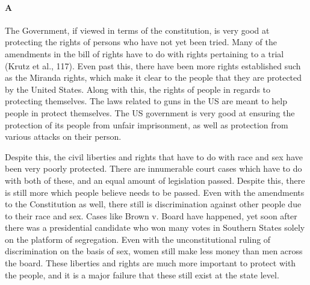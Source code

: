\documentclass[12pt]{article}
\begin{document}
\paragraph{A}
The Government, if viewed in terms of the constitution, is very good
at protecting the rights of persons who have not yet been tried. Many
of the amendments in the bill of rights have to do with rights
pertaining to a trial (Krutz et al., 117). Even past this, there have
been more rights established such as the Miranda rights, which make it
clear to the people that they are protected by the United
States. Along with this, the rights of people in regards to protecting
themselves. The laws related to guns in the US are meant to help
people in protect themselves. The US government is very good at
ensuring the protection of its people from unfair imprisonment, as
well as protection from various attacks on their person.
\par
Despite this, the civil liberties and rights that have to do with race
and sex have been very poorly protected. There are innumerable court
cases which have to do with both of these, and an equal amount of
legislation passed. Despite this, there is still more which people
believe needs to be passed. Even with the amendments to the
Constitution as well, there still is discrimination against other
people due to their race and sex. Cases like Brown v. Board have
happened, yet soon after there was a presidential candidate who won
many votes in Southern States solely on the platform of
segregation. Even with the unconstitutional ruling of discrimination
on the basis of sex, women still make less money than men across the
board. These liberties and rights are much more important to protect
with the people, and it is a major failure that these still exist at
the state level. 
\end{document}
